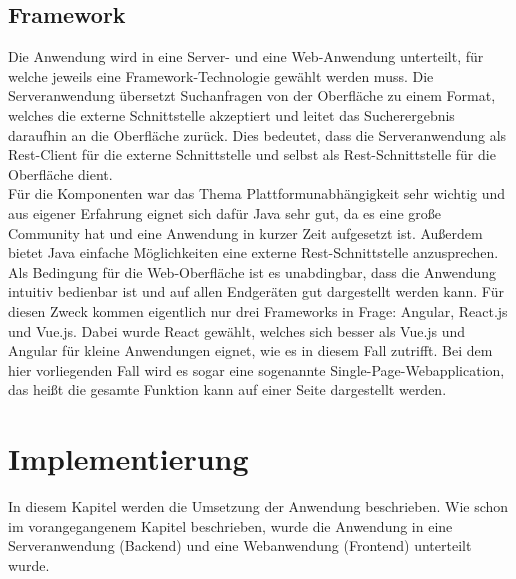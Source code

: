 \documentclass[12pt,twoside,a4paper]{article}
\begin{document}
\subsection{Framework}
Die Anwendung wird in eine Server- und eine Web-Anwendung unterteilt, für welche jeweils eine Framework-Technologie gewählt werden muss. Die Serveranwendung übersetzt Suchanfragen von der Oberfläche zu einem Format, welches die externe Schnittstelle akzeptiert und leitet das Sucherergebnis daraufhin an die Oberfläche zurück. Dies bedeutet, dass die Serveranwendung als Rest-Client für die externe Schnittstelle und selbst als Rest-Schnittstelle für die Oberfläche dient.\\
Für die Komponenten war das Thema Plattformunabhängigkeit sehr wichtig und aus eigener Erfahrung eignet sich dafür Java sehr gut, da es eine große Community hat und eine Anwendung in kurzer Zeit aufgesetzt ist. Außerdem bietet Java einfache Möglichkeiten eine externe Rest-Schnittstelle anzusprechen.\\
Als Bedingung für die Web-Oberfläche ist es unabdingbar, dass die Anwendung intuitiv bedienbar ist und auf allen Endgeräten gut dargestellt werden kann. Für diesen Zweck kommen eigentlich nur drei Frameworks in Frage: Angular, React.js und Vue.js. Dabei wurde React gewählt, welches sich besser als Vue.js und Angular für kleine Anwendungen eignet, wie es in diesem Fall zutrifft. Bei dem hier vorliegenden Fall wird es sogar eine sogenannte Single-Page-Webapplication, das heißt die gesamte Funktion kann auf einer Seite dargestellt werden.
\newpage
\section{Implementierung}
In diesem Kapitel werden die Umsetzung der Anwendung beschrieben. Wie schon im vorangegangenem Kapitel beschrieben, wurde die Anwendung in eine Serveranwendung (Backend) und eine Webanwendung (Frontend) unterteilt wurde.
\end{document}
